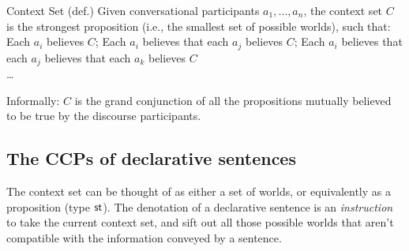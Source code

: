 \documentclass[cronos,landscape,paper=letter]{ling-handout}
\begin{document}
\pex Context Set (def.)
Given conversational participants \(a_{1},\ldots , a_{n}\), the context set \(C\) is the strongest proposition (i.e., the smallest set of possible worlds), such that:
\a Each \(a_{i}\) believes \(C\);
\a Each \(a_{i}\) believes that each \(a_{j}\) believes \(C\);
\a Each \(a_{i}\) believes that each \(a_{j}\) believes that each \(a_{k}\) believes \(C\)\\
\ldots
\xe

Informally: \(C\) is the grand conjunction of all the propositions mutually believed to be true by the discourse participants.

\subsection{The CCPs of declarative sentences}

The context set can be thought of as either a set of worlds, or equivalently as a proposition (type \(\textsf{st}\)). The denotation of a declarative sentence is an \textit{instruction} to take the current context set, and sift out all those possible worlds that aren't compatible with the information conveyed by a sentence.
\end{document}
